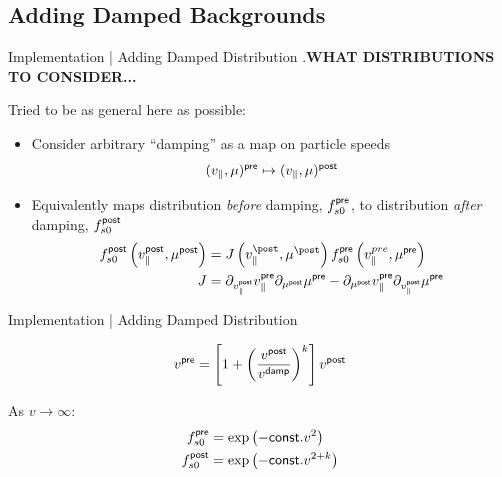 \subsection{Adding Damped Backgrounds}
    \begin{frame}{Implementation | Adding Damped Distribution}
        .{\bf WHAT DISTRIBUTIONS TO CONSIDER...}
        
        Tried to be as general here as possible:
        \begin{itemize}
            \item  Consider arbitrary ``damping'' as a map on particle speeds
            \begin{equation}
                (v_{\parallel}, \mu)^{\sf pre}  \mapsto  (v_{\parallel}, \mu)^{\sf post}
            \end{equation}

            \item  Equivalently maps distribution \emph{before} damping, $f_{s0}^{\sf pre}$, to distribution \emph{after} damping, $f_{s0}^{\sf post}$
            \begin{align}
                f_{s0}^{\sf post}\left(v_{\parallel}^{\sf post}, \mu^{\sf post}\right)  &=  J\left(v_{\parallel}^{\post}, \mu^{\post}\right)f_{s0}^{\sf pre}\left(v_{\parallel}^{pre}, \mu^{\sf pre}\right)  \\
                J  &=  \partial_{v_{\parallel}^{\sf post}}v_{\parallel}^{\sf pre}\partial_{\mu^{\sf post}}\mu^{\sf pre} - \partial_{\mu^{\sf post}}v_{\parallel}^{\sf pre}\partial_{v_{\parallel}^{\sf post}}\mu^{\sf pre}
            \end{align}
        \end{itemize}
    \end{frame}
    
    \begin{frame}{Implementation | Adding Damped Distribution}
        \begin{example}
            \begin{equation}
                v^{\sf pre}  =  \left[1 + \left(\frac{v^{\sf post}}{v^{\sf damp}}\right)^{k}\right]v^{\sf post}
            \end{equation}
        \end{example}
        
        As $v  \rightarrow  \infty$:
        \begin{align}
            f_{s0}^{\sf pre}  &=  \exp\left(- {\sf const.}v^{2}\right)  \\
            f_{s0}^{\sf post}  &=  \exp\left(- {\sf const.}v^{2 + k}\right)
        \end{align}
    \end{frame}

